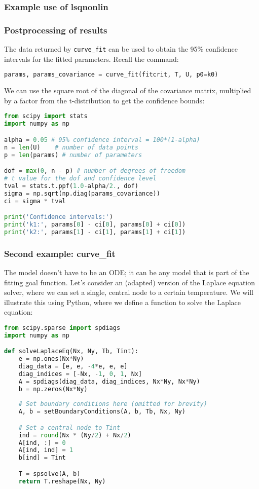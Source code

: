 \begin{frame}[fragile] 
  \frametitle{Example use of lsqnonlin}
  \centering
\end{frame}

\begin{frame}[fragile] 
  \frametitle{Postprocessing of results}
  The data returned by \lstinline|curve_fit| can be used to obtain the 95\% confidence intervals for the fitted parameters. Recall the command:
  \begin{lstlisting}[language=Python]
params, params_covariance = curve_fit(fitcrit, T, U, p0=k0)
  \end{lstlisting}
  We can use the square root of the diagonal of the covariance matrix, multiplied by a factor from the t-distribution to get the confidence bounds:
  \begin{lstlisting}[language=Python,basicstyle=\scriptsize]
from scipy import stats
import numpy as np

alpha = 0.05 # 95% confidence interval = 100*(1-alpha)
n = len(U)    # number of data points
p = len(params) # number of parameters

dof = max(0, n - p) # number of degrees of freedom
# t value for the dof and confidence level
tval = stats.t.ppf(1.0-alpha/2., dof) 
sigma = np.sqrt(np.diag(params_covariance))
ci = sigma * tval

print('Confidence intervals:')
print('k1:', params[0] - ci[0], params[0] + ci[0])
print('k2:', params[1] - ci[1], params[1] + ci[1])
  \end{lstlisting}
  \end{frame}


  \begin{frame}[fragile]
    \frametitle{Second example: curve\_fit}
    The model doesn't have to be an ODE; it can be any model that is part of the fitting goal function. Let's consider an (adapted) version of the Laplace equation solver, where we can set a single, central node to a certain temperature. We will illustrate this using Python, where we define a function to solve the Laplace equation:
    
    \begin{lstlisting}[language=Python, basicstyle=\tiny]
from scipy.sparse import spdiags
import numpy as np

def solveLaplaceEq(Nx, Ny, Tb, Tint):
    e = np.ones(Nx*Ny)
    diag_data = [e, e, -4*e, e, e]
    diag_indices = [-Nx, -1, 0, 1, Nx]
    A = spdiags(diag_data, diag_indices, Nx*Ny, Nx*Ny)
    b = np.zeros(Nx*Ny)
    
    # Set boundary conditions here (omitted for brevity)
    A, b = setBoundaryConditions(A, b, Tb, Nx, Ny)

    # Set a central node to Tint
    ind = round(Nx * (Ny/2) + Nx/2)
    A[ind, :] = 0
    A[ind, ind] = 1
    b[ind] = Tint

    T = spsolve(A, b)
    return T.reshape(Nx, Ny)
    \end{lstlisting}
  \end{frame}
  

